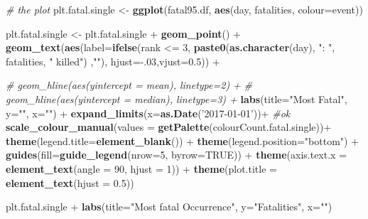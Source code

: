\documentclass[]{article}
\newenvironment{Shaded}{\begin{snugshade}}{\end{snugshade}}
\newcommand{\KeywordTok}[1]{\textcolor[rgb]{0.13,0.29,0.53}{\textbf{{#1}}}}
\newcommand{\DataTypeTok}[1]{\textcolor[rgb]{0.13,0.29,0.53}{{#1}}}
\newcommand{\DecValTok}[1]{\textcolor[rgb]{0.00,0.00,0.81}{{#1}}}
\newcommand{\FloatTok}[1]{\textcolor[rgb]{0.00,0.00,0.81}{{#1}}}
\newcommand{\StringTok}[1]{\textcolor[rgb]{0.31,0.60,0.02}{{#1}}}
\newcommand{\CommentTok}[1]{\textcolor[rgb]{0.56,0.35,0.01}{\textit{{#1}}}}
\newcommand{\OtherTok}[1]{\textcolor[rgb]{0.56,0.35,0.01}{{#1}}}
\newcommand{\NormalTok}[1]{{#1}}
\begin{document}
\begin{Shaded}
\begin{Highlighting}[]
\CommentTok{# the plot}
\NormalTok{plt.fatal.single <-}\StringTok{ }\KeywordTok{ggplot}\NormalTok{(fatal95.df, }\KeywordTok{aes}\NormalTok{(day, fatalities, }\DataTypeTok{colour=}\NormalTok{event))}

\NormalTok{plt.fatal.single <-}\StringTok{ }\NormalTok{plt.fatal.single +}\StringTok{ }\KeywordTok{geom_point}\NormalTok{() +}
\StringTok{        }\KeywordTok{geom_text}\NormalTok{(}\KeywordTok{aes}\NormalTok{(}\DataTypeTok{label=}\KeywordTok{ifelse}\NormalTok{(rank <=}\StringTok{ }\DecValTok{3}\NormalTok{,}
                 \KeywordTok{paste0}\NormalTok{(}\KeywordTok{as.character}\NormalTok{(day), }\StringTok{": "}\NormalTok{, fatalities, }\StringTok{" killed"}\NormalTok{) ,}\StringTok{""}\NormalTok{),}
                \DataTypeTok{hjust=}\NormalTok{-.}\DecValTok{03}\NormalTok{,}\DataTypeTok{vjust=}\FloatTok{0.5}\NormalTok{)) +}

\StringTok{        }\CommentTok{# geom_hline(aes(yintercept = mean), linetype=2) +}
\StringTok{        }\CommentTok{# geom_hline(aes(yintercept = median), linetype=3) +}
\StringTok{        }\KeywordTok{labs}\NormalTok{(}\DataTypeTok{title=}\StringTok{"Most Fatal"}\NormalTok{,}
                    \DataTypeTok{y=}\StringTok{""}\NormalTok{, }\DataTypeTok{x=}\StringTok{""}\NormalTok{) +}
\StringTok{    }
\StringTok{        }\KeywordTok{expand_limits}\NormalTok{(}\DataTypeTok{x=}\KeywordTok{as.Date}\NormalTok{(}\StringTok{'2017-01-01'}\NormalTok{))+}\StringTok{ }\CommentTok{#ok}
\StringTok{        }\KeywordTok{scale_colour_manual}\NormalTok{(}\DataTypeTok{values =} \KeywordTok{getPalette}\NormalTok{(colourCount.fatal.single))+}\StringTok{                }
\StringTok{        }\KeywordTok{theme}\NormalTok{(}\DataTypeTok{legend.title=}\KeywordTok{element_blank}\NormalTok{()) +}
\StringTok{        }\KeywordTok{theme}\NormalTok{(}\DataTypeTok{legend.position=}\StringTok{"bottom"}\NormalTok{) +}
\StringTok{        }\KeywordTok{guides}\NormalTok{(}\DataTypeTok{fill=}\KeywordTok{guide_legend}\NormalTok{(}\DataTypeTok{nrow=}\DecValTok{5}\NormalTok{, }\DataTypeTok{byrow=}\OtherTok{TRUE}\NormalTok{)) +}
\StringTok{        }\KeywordTok{theme}\NormalTok{(}\DataTypeTok{axis.text.x =} \KeywordTok{element_text}\NormalTok{(}\DataTypeTok{angle =} \DecValTok{90}\NormalTok{, }\DataTypeTok{hjust =} \DecValTok{1}\NormalTok{)) +}\StringTok{ }
\StringTok{        }\KeywordTok{theme}\NormalTok{(}\DataTypeTok{plot.title =} \KeywordTok{element_text}\NormalTok{(}\DataTypeTok{hjust =} \FloatTok{0.5}\NormalTok{))                 }

\NormalTok{plt.fatal.single +}\StringTok{ }\KeywordTok{labs}\NormalTok{(}\DataTypeTok{title=}\StringTok{"Most fatal Occurrence"}\NormalTok{,}
                    \DataTypeTok{y=}\StringTok{"Fatalities"}\NormalTok{, }\DataTypeTok{x=}\StringTok{""}\NormalTok{)}
\end{Highlighting}
\end{Shaded}
\end{document}
